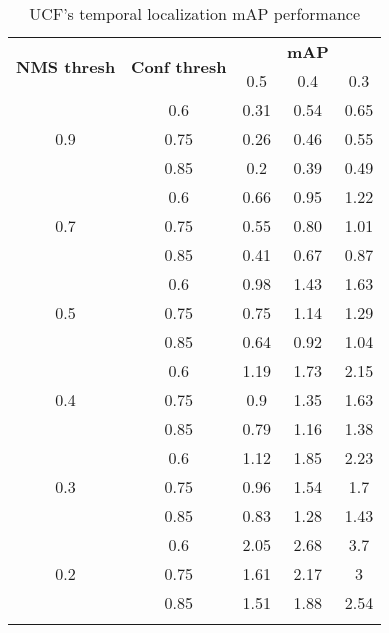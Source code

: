 \begin{center}
  \begin{longtable}{|| c | c || c c c ||}

    \hline
    \multirow{2}{*}{\textbf{NMS thresh}} & \multirow{2}{*}{\textbf{Conf thresh}} & {} & \textbf{mAP} & {}  \\
    {} & {} & 0.5 & 0.4 & 0.3\\
    \hline
    \multirow{3}{*}{0.9} & {0.6} & 0.31 & 0.54 & 0.65 \\
    \cline{2-5}
    {} & {0.75} & 0.26 & 0.46 & 0.55 \\
    \cline{2-5}
    {} & {0.85} & 0.2 & 0.39 & 0.49 \\
    \hline
    \multirow{3}{*}{0.7} & {0.6} & 0.66 & 0.95 & 1.22 \\
    \cline{2-5}
    {} & {0.75} & 0.55 & 0.80 & 1.01 \\
    \cline{2-5}
    {} & {0.85} & 0.41 & 0.67 & 0.87 \\
    \hline
    \multirow{3}{*}{0.5} & {0.6} & 0.98 & 1.43 & 1.63 \\
    \cline{2-5}
    {} & {0.75} & 0.75 & 1.14 & 1.29 \\
    \cline{2-5}
    {} & {0.85} & 0.64 & 0.92 & 1.04 \\
    \hline
    \multirow{3}{*}{0.4} & {0.6} & 1.19 & 1.73 & 2.15 \\
    \cline{2-5}
    {} & {0.75} & 0.9 & 1.35 & 1.63 \\
    \cline{2-5}
    {} & {0.85} & 0.79 & 1.16 & 1.38 \\

    \hline
    \multirow{3}{*}{0.3} & {0.6} & 1.12 & 1.85 & 2.23 \\
    \cline{2-5}
    {} & {0.75} & 0.96 & 1.54 &1.7 \\
    \cline{2-5}
    {} & {0.85} & 0.83 & 1.28 & 1.43 \\
    \hline
    \multirow{3}{*}{0.2} & {0.6} & 2.05 & 2.68 & 3.7 \\
    \cline{2-5}
    {} & {0.75} & 1.61 & 2.17 & 3 \\
    \cline{2-5}
    {} & {0.85} & 1.51 & 1.88 & 2.54 \\

    \hline

    \caption{UCF's temporal localization mAP performance}
    \label{table:temp_cls_2}
  \end{longtable}
\end{center}

